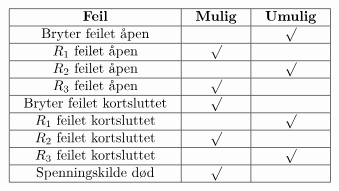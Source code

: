 






$$\vbox{\offinterlineskip
\halign{\strut
\vrule \quad\hfil # \ \hfil &
\vrule \quad\hfil # \ \hfil &
\vrule \quad\hfil # \ \hfil \vrule \cr
\noalign{\hrule}
%
{\bf Feil} & {\bf Mulig} & {\bf Umulig} \cr
%
\noalign{\hrule}
%
Bryter feilet åpen &  & $\surd$ \cr
%
\noalign{\hrule}
%
$R_1$ feilet åpen & $\surd$ &  \cr
%
\noalign{\hrule}
%
$R_2$ feilet åpen &  & $\surd$ \cr
%
\noalign{\hrule}
%
$R_3$ feilet åpen & $\surd$ &  \cr
%
\noalign{\hrule}
%
Bryter feilet kortsluttet & $\surd$ &  \cr
%
\noalign{\hrule}
%
$R_1$ feilet kortsluttet &  & $\surd$ \cr
%
\noalign{\hrule}
%
$R_2$ feilet kortsluttet & $\surd$ &  \cr
%
\noalign{\hrule}
%
$R_3$ feilet kortsluttet &  & $\surd$ \cr
%
\noalign{\hrule}
%
Spenningskilde død & $\surd$ &  \cr
%
\noalign{\hrule}
} %
}$$ %











